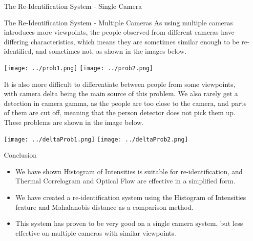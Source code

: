 \documentclass[final]{beamer}
\begin{document}
\begin{frame}{}
\begin{columns}[t]
\begin{column}{.49\linewidth}
\begin{block}{The Re-Identification System - Single Camera}
        \end{block}
        
        \begin{block}{The Re-Identification System - Multiple Cameras}
        \justify
        As using multiple cameras introduces more viewpoints, the people observed from different cameras have differing characteristics, which means they are sometimes similar enough to be re-identified, and sometimes not, as shown in the images below. 	
        	 
 		\texttt{[image: ../prob1.png]}  
 		\hspace{.7cm}
        \texttt{[image: ../prob2.png]}  
        
        \justify It is also more difficult to differentiate between people from some viewpoints, with camera delta being the main source of this problem. We also rarely get a detection in camera gamma, as the people are too close to the camera, and parts of them are cut off, meaning that the person detector does not pick them up. These problems are shown in the image below.
        
        \texttt{[image: ../deltaProb1.png]}
        \hspace{.7cm}
        \texttt{[image: ../deltaProb2.png]}  
        \end{block}
        
        \begin{block}{Conclusion}
        \begin{itemize}
         \item We have shown Histogram of Intensities is suitable for re-identification, and Thermal Correlogram and Optical Flow are effective in a simplified form. 
         \item We have created a re-identification system using the Histogram of Intensities feature and Mahalanobis distance as a comparison method. 
         
         \item This system has proven to be very good on a single camera system, but less effective on multiple cameras with similar viewpoints.
        \end{itemize}
        \end{block}

      \end{column}
    \end{columns}
    

  \end{frame}
\end{document}
